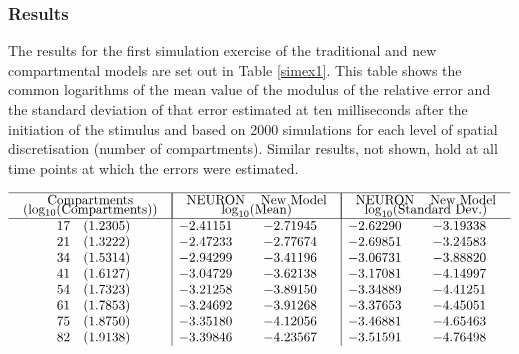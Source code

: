\subsubsection{Results}
The results for the first simulation exercise of the traditional
and new compartmental models are set out in Table \ref{simex1}.
This table shows the common logarithms of the mean value of the
modulus of the relative error and the standard deviation of that
error estimated at ten milliseconds after the initiation of the
stimulus and based on 2000 simulations for each level of spatial
discretisation (number of compartments). Similar results, not
shown, hold at all time points at which the errors were estimated.

\pagebreak[4]

\begin{table}[!h]
\[
\begin{array}{c|cc|cc}
\hline
\mbox{\begin{tabular}{c} Compartments \\[-5pt]
(log$_{10}(\mbox{Compartments}))$ \end{tabular}} &
\multicolumn{2}{|c|}{\mbox{\begin{tabular}{cc}
NEURON & New Model \\[-5pt] \multicolumn{2}{c}{$\log_{10}$(Mean)}
\end{tabular}}}
& \multicolumn{2}{|c}{\mbox{\begin{tabular}{cc}
NEURON & New Model \\[-5pt] \multicolumn{2}{c}{$\log_{10}$(Standard Dev.)} \end{tabular}}}\\
\hline
\phantom{0}17 \quad (1.2305) & -2.41151 & -2.71945 & -2.62290 & -3.19338 \\
\phantom{0}21 \quad (1.3222) & -2.47233 & -2.77674 & -2.69851 & -3.24583 \\
\phantom{0}34 \quad (1.5314) & -2.94299 & -3.41196 & -3.06731 & -3.88820 \\
\phantom{0}41 \quad (1.6127) & -3.04729 & -3.62138 & -3.17081 & -4.14997 \\
\phantom{0}54 \quad (1.7323) & -3.21258 & -3.89150 & -3.34889 & -4.41251 \\
\phantom{0}61 \quad (1.7853) & -3.24692 & -3.91268 & -3.37653 & -4.45051 \\
\phantom{0}75 \quad (1.8750) & -3.35180 & -4.12056 & -3.46881 & -4.65463 \\
\phantom{0}82 \quad (1.9138) & -3.39846 & -4.23567 & -3.51591 & -4.76498 \\

\end{array}\]
\end{table}
